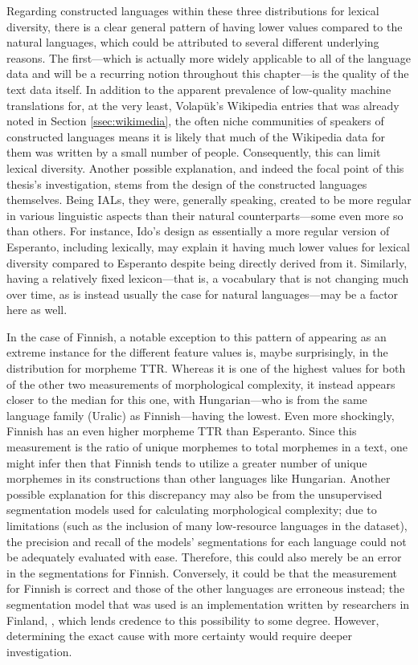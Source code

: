 \documentclass[12pt,a4paper]{article}
\numberwithin{figure}{section}
\numberwithin{table}{section}
\numberwithin{definition}{section}
\begin{document}
Regarding constructed languages within these three distributions for lexical diversity, there is a clear general pattern of having lower values compared to the natural languages, which could be attributed to several different underlying reasons. The first---which is actually more widely applicable to all of the language data and will be a recurring notion throughout this chapter---is the quality of the text data itself. In addition to the apparent prevalence of low-quality machine translations for, at the very least, Volapük's Wikipedia entries that was already noted in Section \ref{ssec:wikimedia}, the often niche communities of speakers of constructed languages means it is likely that much of the Wikipedia data for them was written by a small number of people. Consequently, this can limit lexical diversity. Another possible explanation, and indeed the focal point of this thesis's investigation, stems from the design of the constructed languages themselves. Being IALs, they were, generally speaking, created to be more regular in various linguistic aspects than their natural counterparts---some even more so than others. For instance, Ido's design as essentially a more regular version of Esperanto, including lexically, may explain it having much lower values for lexical diversity compared to Esperanto despite being directly derived from it. Similarly, having a relatively fixed lexicon---that is, a vocabulary that is not changing much over time, as is instead usually the case for natural languages---may be a factor here as well.

In the case of Finnish, a notable exception to this pattern of appearing as an extreme instance for the different feature values is, maybe surprisingly, in the distribution for morpheme TTR. Whereas it is one of the highest values for both of the other two measurements of morphological complexity, it instead appears closer to the median for this one, with Hungarian---who is from the same language family (Uralic) as Finnish---having the lowest. Even more shockingly, Finnish has an even higher morpheme TTR than Esperanto. Since this measurement is the ratio of unique morphemes to total morphemes in a text, one might infer then that Finnish tends to utilize a greater number of unique morphemes in its constructions than other languages like Hungarian. Another possible explanation for this discrepancy may also be from the unsupervised segmentation models used for calculating morphological complexity; due to limitations (such as the inclusion of many low-resource languages in the dataset), the precision and recall of the models' segmentations for each language could not be adequately evaluated with ease. Therefore, this could also merely be an error in the segmentations for Finnish. Conversely, it could be that the measurement for Finnish is correct and those of the other languages are erroneous instead; the segmentation model that was used is an implementation written by researchers in Finland, \textcite{Smit2014inproceedings}, which lends credence to this possibility to some degree. However, determining the exact cause with more certainty would require deeper investigation. 
\end{document}
